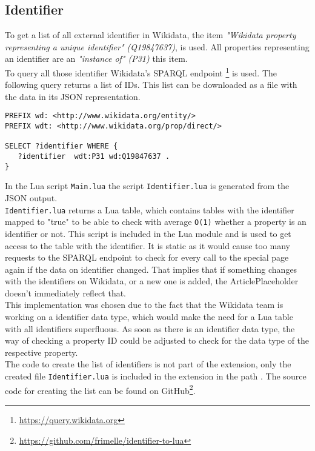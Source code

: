 \subsection{Identifier}

To get a list of all external identifier in Wikidata, the item \textit{"Wikidata property representing a unique identifier" (Q19847637)}, is used. All properties representing an identifier are an \textit{"instance of" (P31)} this item. \\
To query all those identifier Wikidata's SPARQL endpoint \footnote{\href{https://query.wikidata.org}{https://query.wikidata.org}} is used. The following query returns a list of IDs. This list can be downloaded as a file with the data in its JSON representation. \\

\begin{lstlisting}[frame=single] 
PREFIX wd: <http://www.wikidata.org/entity/>
PREFIX wdt: <http://www.wikidata.org/prop/direct/>

SELECT ?identifier WHERE {
   ?identifier  wdt:P31 wd:Q19847637 . 
}
\end{lstlisting}
In the Lua script \texttt{\justify Main.lua} the script \texttt{\justify Identifier.lua} is generated from the JSON output. \\  \texttt{\justify Identifier.lua} returns a Lua table, which contains tables with the identifier mapped to "true" to be able to check with average \texttt{\justify O(1)} whether a property is an identifier or not. This script is included in the Lua module and is used to get access to the table with the identifier. It is static as it would cause too many requests to the SPARQL endpoint to check for every call to the special page again if the data on identifier changed. That implies that if something changes with the identifiers on Wikidata, or a new one is added, the ArticlePlaceholder doesn't immediately reflect that. \\
This implementation was chosen due to the fact that the Wikidata team is working on a identifier data type, which would make the need for a Lua table with all identifiers superfluous. As soon as there is an identifier data type, the way of checking a property ID could be adjusted to check for the data type of the respective property. \\
The code to create the list of identifiers is not part of the extension, only the created file \texttt{\justify Identifier.lua} is included in the extension in the path . The source code for creating the list can be found on GitHub\footnote{\href{https://github.com/frimelle/identifier-to-lua}{https://github.com/frimelle/identifier-to-lua}}. 
